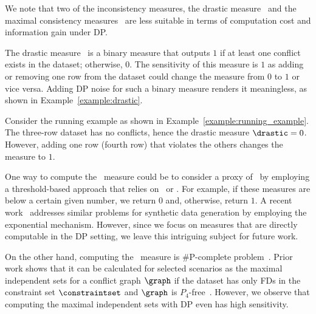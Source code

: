 \label{sec:hardness}

We note that two of the inconsistency measures, the drastic measure \drastic\ and the maximal consistency measures \maxconsistency\  are less suitable in terms of computation cost and information gain under DP. 

The drastic measure \drastic\ is a binary measure that outputs $1$ if at least one conflict exists in the dataset; otherwise, $0$. The sensitivity of this measure is $1$ as adding or removing one row from the dataset could change the measure from $0$ to $1$ or vice versa. Adding DP noise for such a binary measure renders it meaningless, as shown in Example~\ref{example:drastic}.

\begin{example}\label{example:drastic}
    Consider the running example as shown in Example~\ref{example:running_example}. The three-row dataset has no conflicts, hence the drastic measure $\drastic = 0$. However, adding one row (fourth row) that violates the others changes the measure to $1$. 
\end{example}

One way to compute the \drastic\ measure could be to consider a proxy of \drastic\ by employing a threshold-based approach that relies on \problematic\ or \mininconsistency. For example, if these measures are below a certain given number, we return $0$ and, otherwise, return $1$. A recent work~\cite{PatwaSGMR23} addresses similar problems for synthetic data generation by employing the exponential mechanism. However, since we focus on measures that are directly computable in the DP setting, we leave this intriguing subject for future work. 


On the other hand, computing the \maxconsistency\ measure is \#P-complete problem~\cite{LivshitsBKS20}. Prior work shows that it can be calculated for selected scenarios as the maximal independent sets for a conflict graph $\graph$ if the dataset has only FDs in the constraint set $\constraintset$ and $\graph$ is $P_4$-free~\cite{KimelfeldLP20}. However, we observe that computing the maximal independent sets with DP even has high sensitivity.

